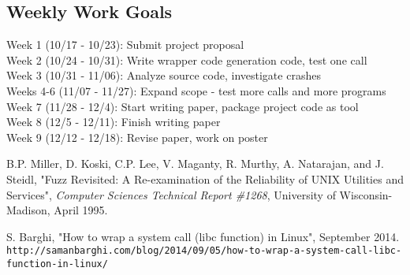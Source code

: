 \documentclass[10pt]{article}
\begin{document}
\subsection{Weekly Work Goals}
\noindent Week 1 (10/17 - 10/23): Submit project proposal\\
Week 2 (10/24 - 10/31): Write wrapper code generation code, test one call\\
Week 3 (10/31 - 11/06): Analyze source code, investigate crashes\\
Weeks 4-6 (11/07 - 11/27): Expand scope - test more calls and more programs\\
Week 7 (11/28 - 12/4): Start writing paper, package project code as tool\\
Week 8 (12/5 - 12/11): Finish writing paper\\
Week 9 (12/12 - 12/18): Revise paper, work on poster\\

\begin{thebibliography}{9}
	B.P. Miller, D. Koski, C.P. Lee, V. Maganty, R. Murthy, A. Natarajan, and J. Steidl, "Fuzz Revisited: A Re-examination of the Reliability of UNIX Utilities and Services", \textit{Computer Sciences Technical Report \#1268}, University of Wisconsin-Madison, April 1995.
	
	S. Barghi, "How to wrap a system call (libc function) in Linux", September 2014.\\
	\texttt{http://samanbarghi.com/blog/2014/09/05/how-to-wrap-a-system-call-libc-function-in-linux/}
\end{thebibliography}
\end{document}
